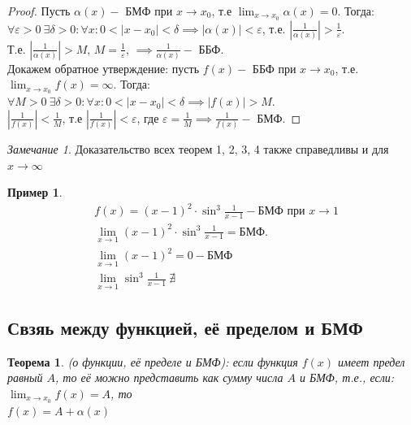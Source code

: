 \documentclass[12pt, a4paper]{article}
\newtheorem{theorem}{Теорема}[subsection]
\newtheorem{example}{Пример}[subsection]
\theoremstyle{remark}
\newtheorem*{remark}{Замечание}
\newcommand{\Y}{\mathbb{\forall}}
\newcommand{\F}{\mathbb{\exists}}
\newcommand{\E}{\mathbb{\varepsilon}}
\begin{document}
	\begin{proof}
		Пусть $\alpha(x) -$ БМФ при $x \to x_0$, т.е \(\lim_{x \to x_0} \alpha(x) = 0\). Тогда: \\
		
		$\Y\E > 0 \ \F\delta > 0: \Y x: 0 < |x - x_0| < \delta \implies |\alpha(x)| < \E$, т.е. $|\frac{1}{\alpha(x)}| > \frac{1}{\E}$. \\
		
		Т.е. $|\frac{1}{\alpha(x)}| > M$, $M = \frac{1}{\E}$, $\implies \frac{1}{\alpha(x)} -$ ББФ.
		\\
		
		Докажем обратное утверждение: пусть $f(x) -$ ББФ при $x \to x_0$, т.е. \(\lim_{x \to x_0} f(x) = \infty\). Тогда: \\
		
		$\Y M > 0 \ \F\delta > 0: \Y x: 0 < |x - x_0| < \delta \implies |f(x)| > M$.
		\\
		
		$|\frac{1}{f(x)}| < \frac{1}{M}$, т.е $|\frac{1}{f(x)}| < \E$, где $\E = \frac{1}{M} \implies \frac{1}{f(x)} -$ БМФ.
	\end{proof}
	
	\begin{remark}
		Доказательство всех теорем 1, 2, 3, 4 также справедливы и для $x \to \infty$
	\end{remark}
	
	\newpage
	
	\begin{example}
		\begin{align*}
			&f(x) = (x - 1)^2 \cdot \sin^3 \frac{1}{x - 1} - \text{БМФ при } x \to 1 \\
			&\lim_{x \to 1} (x - 1)^2 \cdot \sin^3 \frac{1}{x - 1} = \text{БМФ.} \\
			&\lim_{x \to 1} (x - 1)^2 = 0 - \text{БМФ} \\
			&\lim_{x \to 1} \sin^3 \frac{1}{x - 1} \ \nexists
		\end{align*}
	\end{example}
	
	\subsection{Свзяь между функцией, её пределом и БМФ}
	
	\begin{theorem}
		(о функции, её пределе и БМФ): если функция $f(x)$ имеет предел равный $A$, то её можно представить как сумму числа $A$ и БМФ, т.е., если: \\
		
		\(\lim_{x \to x_0} f(x) = A\), то \\
		
		\(f(x) = A + \alpha(x)\)
	\end{theorem}
	
\end{document}
